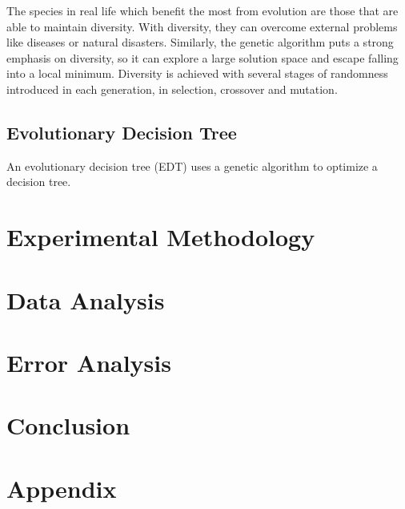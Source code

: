 \documentclass[12pt]{article}
\begin{document}
The species in real life which benefit the most from evolution are those that are able to maintain diversity. With diversity, they can overcome external problems like diseases or natural disasters. Similarly, the genetic algorithm puts a strong emphasis on diversity, so it can explore a large solution space and escape falling into a local minimum. Diversity is achieved with several stages of randomness introduced in each generation, in selection, crossover and mutation.

\subsection{Evolutionary Decision Tree}

An evolutionary decision tree (EDT) uses a genetic algorithm to optimize a decision tree.

\section{Experimental Methodology}

\section{Data Analysis}

\section{Error Analysis}

\section{Conclusion}

\section{Appendix}



\end{document}
